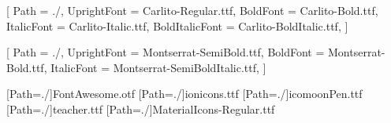 
\setmainfont{Carlito}[
  Path           = ./,
  UprightFont    = Carlito-Regular.ttf,
  BoldFont       = Carlito-Bold.ttf,
  ItalicFont     = Carlito-Italic.ttf,
  BoldItalicFont = Carlito-BoldItalic.ttf,
]

\newfontfamily{}[
  Path        = ./,
  UprightFont = Montserrat-SemiBold.ttf,
  BoldFont    = Montserrat-Bold.ttf,
  ItalicFont  = Montserrat-SemiBoldItalic.ttf,
]

\newfontfamily{\awesomeFontNew}[Path=./]{FontAwesome.otf}
\newfontfamily{\ioniconsFont}[Path=./]{ionicons.ttf}
\newfontfamily{\icomoonPenFont}[Path=./]{icomoonPen.ttf}
\newfontfamily{\teacherFont}[Path=./]{teacher.ttf}
\newfontfamily{\materialFont}[Path=./]{MaterialIcons-Regular.ttf}

\newcommand{\seticon}[1]{\textcolor{myblue}{\upshape\csname #1\endcsname}}
